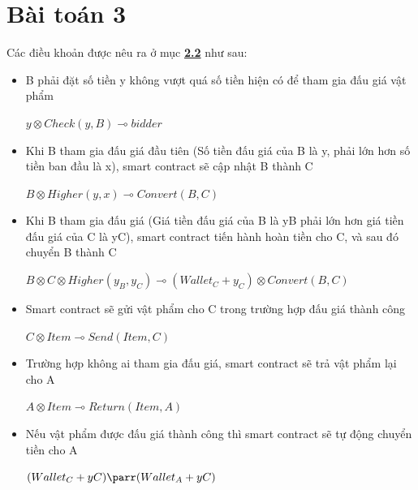 \documentclass[a4paper]{article}
\begin{document}
\section{Bài toán 3}
Các điều khoản được nêu ra ở mục \hyperref[dieukhoan]{\textbf{2.2}} như sau:
\begin{itemize}
    \item B phải đặt số tiền y không vượt quá số tiền hiện có để tham gia đấu giá vật phẩm\\
    \begin{center}
        $y \otimes Check(y,B) \multimap bidder$
    \end{center}
    
    \item Khi B tham gia đấu giá đầu tiên (Số tiền đấu giá của B là y, phải lớn hơn số tiền ban đầu là x), smart contract sẽ cập nhật B thành C\\
    \begin{center}
        $B \otimes Higher(y,x) \multimap Convert(B, C)$
    \end{center}
    
    \item Khi B tham gia đấu giá (Giá tiền đấu giá của B là yB phải lớn hơn giá tiền đấu giá của C là yC), smart contract tiến hành hoàn tiền cho C, và sau đó chuyển B thành C\\
    \begin{center}
        $B \otimes C \otimes Higher(y_{B}, y_{C}) \multimap (Wallet_{C} + y_{C}) \otimes Convert(B,C)$
    \end{center}
    
    \item Smart contract sẽ gửi vật phẩm cho C trong trường hợp đấu giá thành công\\
    \begin{center}
        $C \otimes Item \multimap Send(Item,C)$
    \end{center}
    
    \item Trường hợp không ai tham gia đấu giá, smart contract sẽ trả vật phẩm lại cho A\\
    \begin{center}
        $A \otimes Item \multimap Return(Item,A)$
    \end{center}
    
    \item Nếu vật phẩm được đấu giá thành công thì smart contract sẽ tự động chuyển tiền cho A\\
    \begin{center}
        $(Wallet_{C} + yC) \parr (Wallet_{A} + yC)$
    \end{center}
    

\end{itemize}
\end{document}
